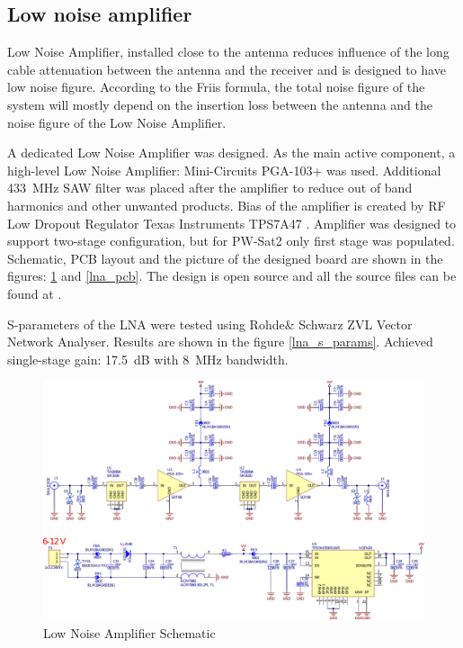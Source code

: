 \subsection{Low noise amplifier}
Low Noise Amplifier, installed close to the antenna reduces influence of the long cable attenuation between the antenna and the receiver and is designed to have low noise figure. According to the Friis formula, the total noise figure of the system will mostly depend on the insertion loss between the antenna and the noise figure of the Low Noise Amplifier. 

A dedicated Low Noise Amplifier was designed. As the main active component, a high-level Low Noise Amplifier: Mini-Circuits PGA-103+ \cite{lna_pga_datasheet} was used. Additional \SI{433}{\MHz} SAW filter was placed after the amplifier to reduce out of band harmonics and other unwanted products. Bias of the amplifier is created by RF Low Dropout Regulator Texas Instruments TPS7A47 \cite{lna_ldo_datasheet}. Amplifier was designed to support two-stage configuration, but for PW-Sat2 only first stage was populated. Schematic, PCB layout and the picture of the designed board are shown in the figures: \ref{lna_schematic} and \ref{lna_pcb}. The design is open source and all the source files can be found at \cite{lna_github}.

S-parameters of the LNA were tested using Rohde\& Schwarz ZVL Vector Network Analyser. Results are shown in the figure \ref{lna_s_params}. Achieved single-stage gain: \SI{17.5}{\dB} with \SI{8}{\MHz} bandwidth.

\begin{landscape}
\begin{figure}
    \centering
    \includegraphics[width=1.12\paperwidth]{img/5/lna_schematic.pdf}
    \caption{Low Noise Amplifier Schematic}
    \label{lna_schematic}
\end{figure}
\end{landscape}

